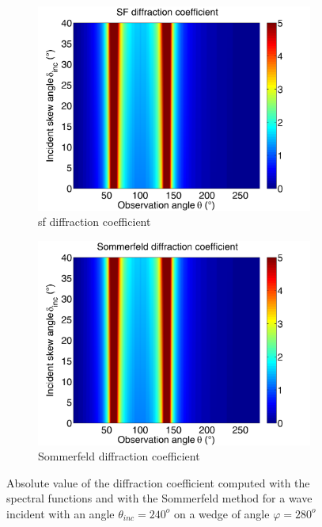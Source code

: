 \begin{figure}
\centering
\begin{subfigure}[b]{0.49\textwidth}
        \includegraphics[width=\textwidth]{images/chapter4/Xprop_280_239.png}
        \caption{\acrshort{sf} diffraction coefficient}
        \label{C4:acSF280240}
    \end{subfigure}
\begin{subfigure}[b]{0.49\textwidth}
        \includegraphics[width=\textwidth]{images/chapter4/Sommerfeld_280_239.png}
        \caption{Sommerfeld diffraction coefficient}
        \label{C4:Som280240}
    \end{subfigure}
\caption{Absolute value of the diffraction coefficient computed with the spectral functions and with the Sommerfeld method for a wave incident with an angle $\theta_{inc}=240^o$ on a wedge of angle $\varphi=280^o$}
\label{C4:ac280240}
\end{figure}

